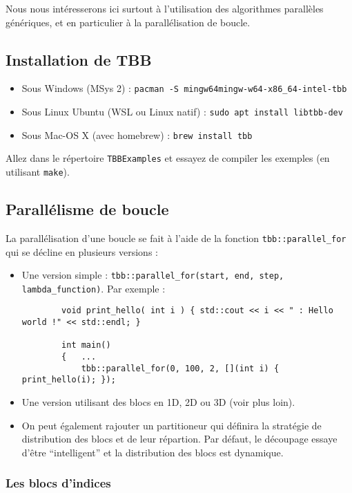 \documentclass[11pt,a4paper]{article}
\begin{document}
Nous nous intéresserons ici surtout à l'utilisation des algorithmes parallèles génériques, et en particulier à la parallélisation de boucle.

\subsection{Installation de TBB}

\begin{itemize}
\item Sous Windows (MSys 2) : \texttt{pacman -S mingw64\/mingw-w64-x86\_64-intel-tbb}
\item Sous Linux Ubuntu (WSL ou Linux natif) : \texttt{sudo apt install libtbb-dev}
\item Sous Mac-OS X (avec homebrew) : \texttt{brew install tbb}
\end{itemize}

Allez dans le répertoire \texttt{TBBExamples} et essayez de compiler les exemples
(en utilisant \texttt{make}).

\subsection{Parallélisme de boucle}

La parallélisation d'une boucle se fait à l'aide de la fonction \texttt{tbb::parallel\_for} qui se décline en plusieurs
versions :
\begin{itemize}
    \item Une version simple : \texttt{tbb::parallel\_for(start, end, step, lambda\_function)}. Par exemple :
    \begin{lstlisting}
        void print_hello( int i ) { std::cout << i << " : Hello world !" << std::endl; }
        
        int main()
        {   ...
            tbb::parallel_for(0, 100, 2, [](int i) { print_hello(i); });        
    \end{lstlisting}
    \item Une version utilisant des blocs en 1D, 2D ou 3D (voir plus loin).
    \item On peut également rajouter un partitioneur qui définira la stratégie de
          distribution des blocs et de leur répartion. Par défaut, le découpage essaye 
          d'être ``intelligent'' et la distribution des blocs est dynamique.
\end{itemize}

\subsubsection{Les blocs d'indices}
\end{document}
